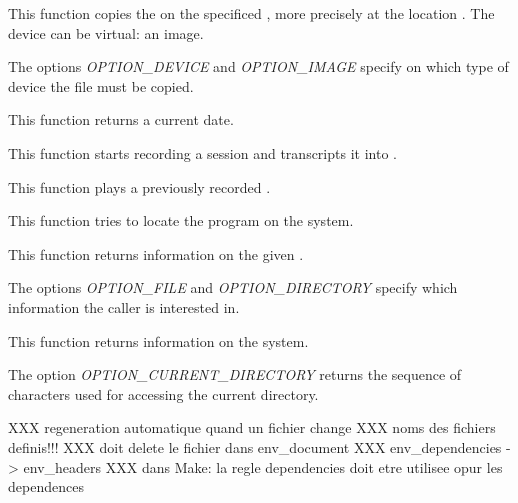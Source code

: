          {
	   This function copies the  on the specificed
	   , more precisely at the location .
	   The device can be virtual: an image.

	   \-

	   The options \textit{OPTION\_DEVICE} and \textit{OPTION\_IMAGE}
	   specify on which type of device the file must be copied.
	 }

         {
	   This function returns a current date.
	 }

         {
	   This function starts recording a session and transcripts it
           into .
	 }

         {
	   This function plays a previously recorded .
	 }

         {
	   This function tries to locate the program 
	   on the system.
	 }

         {
	   This function returns information on the given .

	   \-

	   The options \textit{OPTION\_FILE} and \textit{OPTION\_DIRECTORY}
	   specify which information the caller is interested in.
	 }

         {
	   This function returns information on the system.

	   \-

	   The option \textit{OPTION\_CURRENT\_DIRECTORY} returns the
           sequence of characters used for accessing the current directory.
	 }

XXX regeneration automatique quand un fichier change
XXX noms des fichiers definis!!!
XXX doit delete le fichier dans env_document
XXX env_dependencies -> env_headers
XXX dans Make: la regle dependencies doit etre utilisee opur les dependences
